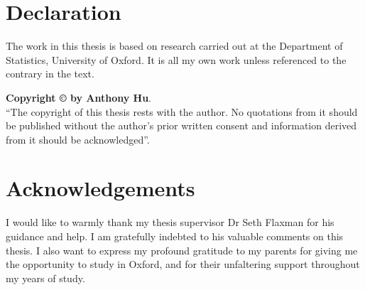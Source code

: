

\chapter*{Declaration}
The work in this thesis is based on research carried out at the Department of Statistics, University of Oxford. It is all my own work unless referenced to the contrary in the text.


\vfill
\noindent \textbf{Copyright \copyright{} by Anthony Hu}.\\
``The copyright of this thesis rests with the author.  No quotations
from it should be published without the author's prior written consent
and information derived from it should be acknowledged''.



\chapter*{Acknowledgements}
I would like to warmly thank my thesis supervisor Dr Seth Flaxman for his guidance and help. I am gratefully indebted to his valuable comments on this thesis.
I also want to express my profound gratitude to my parents for giving me the opportunity to study in Oxford, and for their unfaltering support throughout my years of study. 

